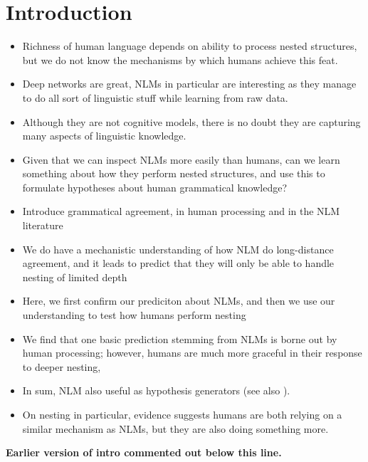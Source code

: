 \section{Introduction}

\begin{itemize}
\item Richness of human language depends on ability to
  process nested structures, but we do not know the mechanisms by
  which humans achieve this feat.
\item Deep networks are great, NLMs in particular are interesting as
  they manage to do all sort of linguistic stuff while learning from
  raw data.
\item Although they are not cognitive models, there is no doubt they
  are capturing many aspects of linguistic knowledge.
\item Given that we can inspect NLMs more easily than humans, can we
  learn something about how they perform nested structures, and use
  this to formulate hypotheses about human grammatical knowledge?
\item Introduce grammatical agreement, in human processing and in the
  NLM literature
\item We do have a mechanistic understanding of how NLM do
  long-distance agreement, and it leads to predict that they will only
  be able to handle nesting of limited depth
\item Here, we first confirm our prediciton about NLMs, and then we
  use our understanding to test how humans perform nesting
\item We find that one basic prediction stemming from NLMs is borne
  out by human processing; however, humans are much more graceful in
  their response to deeper nesting,
\item In sum, NLM also useful as hypothesis generators (see also
  \citealt{Cichy:Kaiser:2019}).
\item On nesting in particular, evidence suggests humans are both
  relying on a similar mechanism as NLMs, but they are also doing something more.
\end{itemize}


\textbf{Earlier version of intro commented out below this line.}


